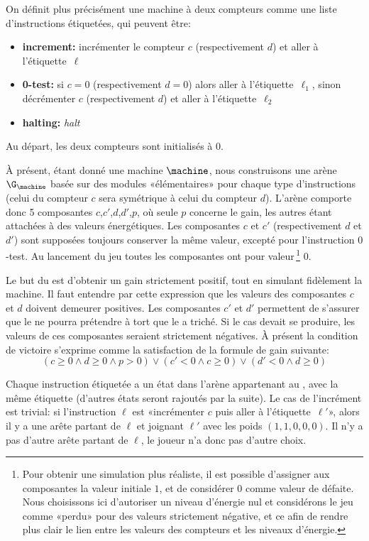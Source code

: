 On définit plus précisément une machine à deux compteurs comme une liste d'instructions étiquetées, qui peuvent être:
\begin{itemize}
    \item \textbf{increment:} incrémenter le compteur $c$ (respectivement $d$) et aller à l'étiquette~$\ell$
    \item \textbf{0-test:} si $c=0$ (respectivement $d=0$) alors aller à l'étiquette~$\ell_1$, sinon décrémenter $c$ (respectivement $d$) et aller à l'étiquette~$\ell_2$
    \item \textbf{halting:} \emph{halt}
\end{itemize}
Au départ, les deux compteurs sont initialisés à $0$.

À présent, étant donné une machine $\machine$, nous construisons une arène $\G_\machine$ basée sur des modules «élémentaires» pour chaque type d'instructions (celui du compteur $c$ sera symétrique à celui du compteur $d$).
L'arène comporte donc 5 composantes $c$,$c'$,$d$,$d'$,$p$, où seule $p$ concerne le gain, les autres étant attachées à des valeurs énergétiques.
Les composantes $c$ et $c'$ (respectivement $d$ et $d'$) sont supposées toujours conserver la même valeur, excepté pour l'instruction $0$-test.
Au lancement du jeu toutes les composantes ont pour valeur\,\footnote{Pour obtenir une simulation plus réaliste, il est possible d'assigner aux composantes la valeur initiale $1$, et de considérer $0$ comme valeur de défaite. Nous choisissons ici d'autoriser un niveau d'énergie nul et considérons le jeu comme «perdu» pour des valeurs strictement négative, et ce afin de rendre plus clair le lien entre les valeurs des compteurs et les niveaux d'énergie.} $0$.

Le but du \jo est d'obtenir un gain strictement positif, tout en simulant fidèlement la machine.
Il faut entendre par cette expression que les valeurs des composantes $c$ et $d$ doivent demeurer positives.
Les composantes $c'$ et $d'$ permettent de s'assurer que le \ji ne pourra prétendre à tort que le \jo a triché.
Si le cas devait se produire, les valeurs de ces composantes seraient strictement négatives.
À présent la condition de victoire s'exprime comme la satisfaction de la formule de gain suivante:
\[(c\geq0 \wedge d\geq0 \wedge p>0) \vee (c'<0 \wedge c\geq0) \vee (d'<0 \wedge d\geq0)\]

Chaque instruction étiquetée a un état dans l'arène appartenant au \jo, avec la même étiquette (d'autres états seront rajoutés par la suite).
Le cas de l'incrément est trivial: si l'instruction $\ell$ est «incrémenter $c$ puis aller à l'étiquette~$\ell'$», alors il y a une arête partant de $\ell$ et joignant $\ell'$ avec les poids $(1,1,0,0,0)$.
Il n'y a pas d'autre arête partant de $\ell$, le joueur n'a donc pas d'autre choix.

